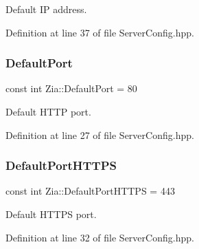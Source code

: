 Default IP address. 



Definition at line 37 of file Server\+Config.\+hpp.

\mbox{\label{namespace_zia_a7b72c978ae2e795f74ce73291ebe3593}} 
\subsubsection{\texorpdfstring{Default\+Port}{DefaultPort}}
{\footnotesize\ttfamily const int Zia\+::\+Default\+Port = 80}



Default H\+T\+TP port. 



Definition at line 27 of file Server\+Config.\+hpp.

\mbox{\label{namespace_zia_ae53d6fd6614900bbc59b6912d6a629d4}} 
\subsubsection{\texorpdfstring{Default\+Port\+H\+T\+T\+PS}{DefaultPortHTTPS}}
{\footnotesize\ttfamily const int Zia\+::\+Default\+Port\+H\+T\+T\+PS = 443}



Default H\+T\+T\+PS port. 



Definition at line 32 of file Server\+Config.\+hpp.

